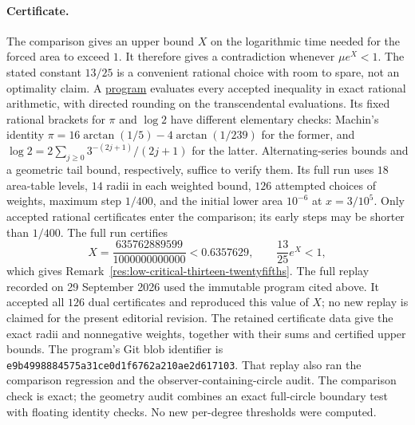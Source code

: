 \paragraph{Certificate.}
The comparison gives an upper bound $X$ on the logarithmic time needed
for the forced area to exceed $1$. It therefore gives a contradiction
whenever $\mu e^X<1$. The stated constant $13/25$ is a convenient rational
choice with room to spare, not an optimality claim. A
\href{https://github.com/wcook04/plectis-erdos/blob/f36a98bf3d3e6f65f1074e3b800e3293d5b8a51a/ErdosProblems/Erdos1041/scripts/check_erdos1041_angular_budget_closure.py}{program} evaluates
every accepted inequality in exact rational arithmetic, with directed rounding
on the transcendental evaluations. Its fixed rational brackets for $\pi$
and $\log2$ have different elementary checks: Machin's identity
$\pi=16\arctan(1/5)-4\arctan(1/239)$ for the former, and
$\log2=2\sum_{j\ge0}3^{-(2j+1)}/(2j+1)$ for the latter.
Alternating-series bounds and a geometric tail bound, respectively,
suffice to verify them. Its full run uses $18$ area-table levels,
$14$ radii in each weighted bound,
$126$ attempted choices of weights, maximum step $1/400$, and the
initial lower area $10^{-6}$ at $x=3/10^5$. Only accepted rational
certificates enter the comparison; its early steps may be shorter than
$1/400$. The full run
certifies
\[
 X=\frac{635762889599}{1000000000000}<0.6357629,
 \qquad \frac{13}{25}e^{X}<1,
\]
which gives Remark~\ref{res:low-critical-thirteen-twentyfifths}.
The full replay recorded on 29 September 2026 used
the immutable program cited above. It accepted all $126$ dual
certificates and reproduced this value of $X$; no new replay is claimed
for the present editorial revision. The retained certificate data give the exact radii and nonnegative
weights, together with their sums and certified upper bounds. The program's Git blob identifier is
\texttt{e9b4998884575a31ce0d1f6762a210ae2d617103}.
That replay also ran the comparison regression and the
observer-containing-circle audit. The comparison check is exact; the geometry audit combines
an exact full-circle boundary test with floating identity checks.
No new per-degree thresholds were computed.

